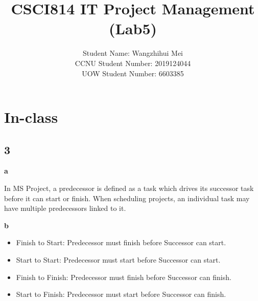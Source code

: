 \documentclass[runningheads]{llncs}
\begin{document}
\title{\large{CSCI814 IT Project Management (Lab5)}}

%
%
\author{\large{Student Name: Wangzhihui Mei \\ %
CCNU Student Number: 2019124044 \\ %
UOW Student Number: 6603385}}  %







\maketitle
\clearpage


\section*{In-class}
\subsection*{3}
\textbf{a}

In MS Project, a predecessor is defined as a task which drives its successor task before it can start or finish. When scheduling projects, an individual task may have multiple predecessors linked to it.

\noindent\textbf{b}
\begin{itemize}
    \item Finish to Start: Predecessor must finish before Successor can start.
    \item Start to Start: Predecessor must start before Successor can start.
    \item Finish to Finish: Predecessor must finish before Successor can finish.
    \item Start to Finish: Predecessor must start before Successor can finish.
\end{itemize}
\end{document}
